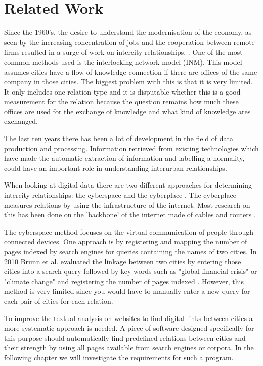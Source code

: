 \chapter{Related Work}\label{sec:related work}
Since the 1960's, the desire to understand the modernisation of the economy, as seen by the increasing concentration of jobs and the cooperation between remote firms resulted in a surge of work on intercity relationships. \cite{tornqvist1968flows}.
One of the most common methods used is the interlocking network model (INM)\cite{taylor2012interlocking}. This model assumes cities have a flow of knowledge connection if there are offices of the same company in those cities. The biggest problem with this is that it is very limited. It only includes one relation type and it is disputable whether this is a good measurement for the relation \cite{lambregts2008geographies} because the question remains how much these offices are used for the exchange of knowledge and what kind of knowledge ares exchanged.

The last ten years there has been a lot of development in the field of data production and processing. Information retrieved from existing technologies which have made the automatic extraction of information and labelling a normality, could have an important role in understanding interurban relationships.

When looking at digital data there are two different approaches for determining intercity relationships: the cyberspace and the cyberplace \cite{devriendt2008cyberplace}. The cyberplace measures relations by using the infrastructure of the internet. Most research on this has been done on the 'backbone' of the internet made of cables and routers \cite{choi2006comparing, gorman2000networks}.

The cyberspace method focuses on the virtual communication of people through connected devices. One approach is by registering and mapping the number of pages indexed by search engines for queries containing the names of two cities\cite{devriendt2008cyberplace, janc2015visibility, janc2015geography}. In 2010 Brunn et al. evaluated the linkage between two cities by entering those cities into a search query followed by key words such as "global financial crisis" or "climate change" and registering the number of pages indexed \cite{brunn2010networks}. However, this method is very limited since you would have to manually enter a new query for each pair of cities for each relation.

To improve the textual analysis on websites to find digital links between cities a more systematic approach is needed. A piece of software designed specifically for this purpose should automatically find predefined relations between cities and their strength by using all pages available from search engines or corpora. In the following chapter we will investigate the requirements for such a program.
